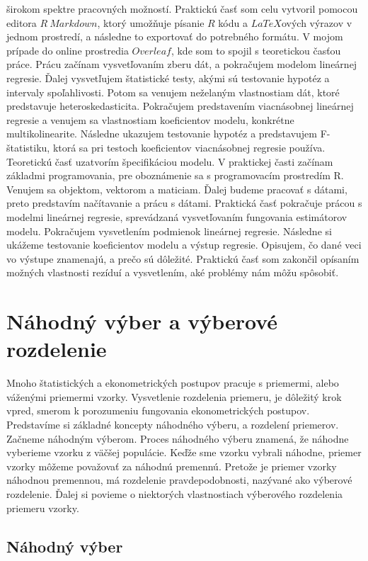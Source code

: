 \documentclass[]{tukediphc}
\begin{document}
širokom spektre pracovných možností. Praktickú časť som celu vytvoril pomocou editora $R \ Markdown$, ktorý umožňuje písanie $R$ kódu a $LaTeX$ových výrazov v jednom prostredí, a následne to exportovať do potrebného formátu. V mojom prípade do online prostredia $Overleaf$, kde som to spojil s teoretickou časťou práce. Prácu začínam vysvetľovaním zberu dát, a pokračujem modelom lineárnej regresie. Ďalej vysvetľujem štatistické testy, akými sú testovanie hypotéz a intervaly spoľahlivosti. Potom sa venujem neželaným vlastnostiam dát, ktoré predstavuje heteroskedasticita. Pokračujem predstavením viacnásobnej lineárnej regresie a venujem sa vlastnostiam koeficientov modelu, konkrétne multikolinearite. Následne ukazujem testovanie hypotéz a predstavujem F-štatistiku, ktorá sa pri testoch koeficientov viacnásobnej regresie používa. Teoretickú časť uzatvorím špecifikáciou modelu. V praktickej časti začínam základmi programovania, pre oboznámenie sa s programovacím prostredím R. Venujem sa objektom, vektorom a maticiam. Ďalej budeme pracovať s dátami, preto predstavím načítavanie a prácu s dátami. Praktická časť pokračuje prácou s modelmi lineárnej regresie, sprevádzaná vysvetľovaním fungovania estimátorov modelu. Pokračujem vysvetlením podmienok lineárnej regresie. Následne si ukážeme testovanie koeficientov modelu a výstup regresie. Opisujem, čo dané veci vo výstupe znamenajú, a prečo sú dôležité. Praktickú časť som zakončil opísaním možných vlastnosti rezíduí a vysvetlením, aké problémy nám môžu spôsobiť.

\newpage

\section{Náhodný výber a výberové rozdelenie}

Mnoho štatistických a ekonometrických postupov pracuje s priemermi, alebo váženými priemermi vzorky. Vysvetlenie rozdelenia priemeru, je dôležitý krok vpred, smerom k porozumeniu fungovania ekonometrických postupov. Predstavíme si základné koncepty náhodného výberu, a rozdelení priemerov. Začneme náhodným výberom. Proces náhodného výberu znamená, že náhodne vyberieme vzorku z väčšej populácie. Keďže sme vzorku vybrali náhodne, priemer vzorky môžeme považovať za náhodnú premennú. Pretože je priemer vzorky náhodnou premennou, má rozdelenie pravdepodobnosti, nazývané ako výberové rozdelenie. Ďalej si povieme o niektorých vlastnostiach výberového rozdelenia priemeru vzorky. 

\subsection{Náhodný výber}
\end{document}
